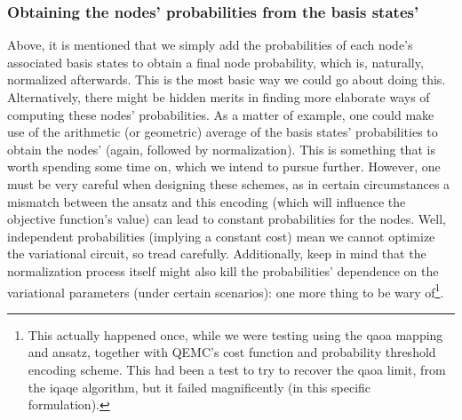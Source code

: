 \subsubsection*{Obtaining the nodes' probabilities from the basis states'}
Above, it is mentioned that we simply add the probabilities of each node's associated basis states to obtain a final node probability, which is, naturally, normalized afterwards. This is the most basic way we could go about doing this. Alternatively, there might be hidden merits in finding more elaborate ways of computing these nodes' probabilities. As a matter of example, one could make use of the arithmetic (or geometric) average of the basis states' probabilities to obtain the nodes' (again, followed by normalization). This is something that is worth spending some time on, which we intend to pursue further. However, one must be very careful when designing these schemes, as in certain circumstances a mismatch between the ansatz and this encoding (which will influence the objective function's value) can lead to constant probabilities for the nodes. Well, independent probabilities (implying a constant cost) mean we cannot optimize the variational circuit, so tread carefully. Additionally, keep in mind that the normalization process itself might also kill the probabilities' dependence on the variational parameters (under certain scenarios): one more thing to be wary of\footnote{This actually happened once, while we were testing using the \acrshort{qaoa} mapping and ansatz, together with QEMC's cost function and probability threshold encoding scheme. This had been a test to try to recover the \acrshort{qaoa} limit, from the \acrshort{iqaqe} algorithm, but it failed magnificently (in this specific formulation).}.

